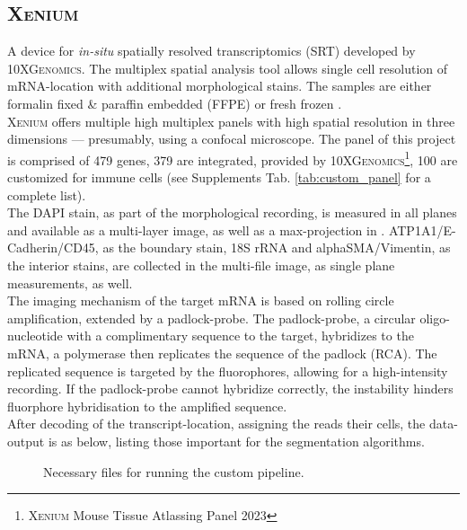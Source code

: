 \subsection*{\textsc{Xenium}}
A device for \textit{in-situ} spatially resolved transcriptomics (SRT) developed by \textsc{10XGenomics}. The multiplex spatial analysis tool allows single cell resolution of mRNA-location with additional morphological stains. The samples are either formalin fixed \& paraffin embedded (FFPE) or fresh frozen \cite{janesick_high_2023}.\\
\textsc{Xenium} offers multiple high multiplex panels with high spatial resolution in three dimensions --- presumably, using a confocal microscope. The panel of this project is comprised of 479 genes, 379 are integrated, provided by \textsc{10XGenomics}\footnote{\textsc{Xenium} Mouse Tissue Atlassing Panel 2023}, 100 are customized for immune cells (see Supplements Tab. \ref{tab:custom_panel} for a complete list).\\ %
The DAPI stain, as part of the morphological recording, is measured in all planes and available as a multi-layer image, as well as a max-projection in . ATP1A1/E-Cadherin/CD45, as the boundary stain, 18S rRNA and alphaSMA/Vimentin, as the interior stains, are collected in the  multi-file image, as single plane measurements, as well. \\
The imaging mechanism of the target mRNA is based on rolling circle amplification, extended by a padlock-probe. The padlock-probe, a circular oligo-nucleotide with a complimentary sequence to the target, hybridizes to the mRNA, a polymerase then replicates the sequence of the padlock (RCA). The replicated sequence is targeted by the fluorophores, allowing for a high-intensity recording. If the padlock-probe cannot hybridize correctly, the instability hinders fluorphore hybridisation to the amplified sequence. \cite{jain_padlock_2021}\\
After decoding of the transcript-location, assigning the reads their cells, the data-output is as below, listing those important for the segmentation algorithms.
% 
\vspace{9pt}
\begin{figure}
    \caption{Necessary files for running the custom pipeline.}
    \label{dir:XenOut}
\end{figure}
% 
